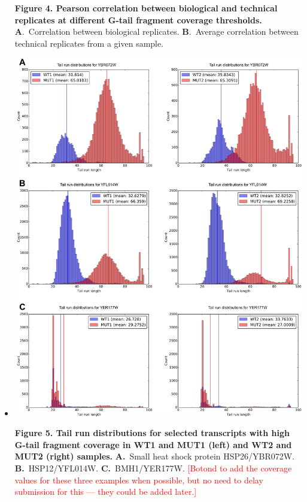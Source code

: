 \documentclass[10pt]{article}
\newcommand{\note}[1]{\textcolor{red}{[#1]}}  %
\begin{document}
\begin{itemize}
{\textbf{Figure 4. Pearson correlation between biological and technical replicates at different G-tail fragment coverage thresholds.} \textbf{A}.~Correlation between biological replicates.  \textbf{B}.~Average correlation between technical replicates from a given sample.}
\newpage

\item[]{
\begin{center}
\includegraphics[scale=0.9]{Figure5.png}
\end{center}

\textbf{Figure 5. Tail run distributions for selected transcripts with high G-tail fragment coverage in WT1 and MUT1 (left) and 
WT2 and MUT2 (right) samples.} \textbf{A.}~Small heat shock protein HSP26/YBR072W. \textbf{B.}~HSP12/YFL014W. \textbf{C.}~BMH1/YER177W.
\note{Botond to add the coverage values for these three examples when possible, but no need to delay submission for this --- they could be added later.}
}

\end{itemize}
\end{document}
